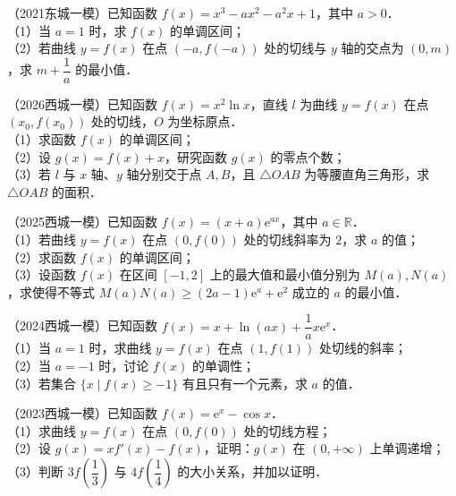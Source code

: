 \begin{example}
（2021东城一模）已知函数 $f(x)=x^3-ax^2-a^2x+1$，其中 $a>0$．\\
（1）当 $a=1$ 时，求 $f(x)$ 的单调区间；\\
（2）若曲线 $y=f(x)$ 在点 $(-a,f(-a))$ 处的切线与 $y$ 轴的交点为 $(0,m)$，求 $m+\dfrac1a$ 的最小值．
\end{example}

\begin{example}
（2026西城一模）已知函数 $f(x)=x^2\ln x$，直线 $l$ 为曲线 $y=f(x)$ 在点 $(x_0,f(x_0))$ 处的切线，$O$ 为坐标原点．\\
（1）求函数 $f(x)$ 的单调区间；\\
（2）设 $g(x)=f(x)+x$，研究函数 $g(x)$ 的零点个数；\\
（3）若 $l$ 与 $x$ 轴、$y$ 轴分别交于点 $A,B$，且 $\triangle OAB$ 为等腰直角三角形，求 $\triangle OAB$ 的面积．
\end{example}

\begin{example}
（2025西城一模）已知函数 $f(x)=(x+a)\mathrm{e}^{ax}$，其中 $a\in\mathbb{R}$．\\
（1）若曲线 $y=f(x)$ 在点 $(0,f(0))$ 处的切线斜率为 $2$，求 $a$ 的值；\\
（2）求函数 $f(x)$ 的单调区间；\\
（3）设函数 $f(x)$ 在区间 $[-1,2]$ 上的最大值和最小值分别为 $M(a),N(a)$，求使得不等式 $M(a)N(a)\geqslant(2a-1)\mathrm{e}^a+\mathrm{e}^2$ 成立的 $a$ 的最小值．
\end{example}

\begin{example}
（2024西城一模）已知函数 $f(x)=x+\ln(ax)+\dfrac1a x\mathrm{e}^x$．\\
（1）当 $a=1$ 时，求曲线 $y=f(x)$ 在点 $(1,f(1))$ 处切线的斜率；\\
（2）当 $a=-1$ 时，讨论 $f(x)$ 的单调性；\\
（3）若集合 $\{x\mid f(x)\geqslant-1\}$ 有且只有一个元素，求 $a$ 的值．
\end{example}

\begin{example}
（2023西城一模）已知函数 $f(x)=\mathrm{e}^x-\cos x$．\\
（1）求曲线 $y=f(x)$ 在点 $(0,f(0))$ 处的切线方程；\\
（2）设 $g(x)=xf'(x)-f(x)$，证明：$g(x)$ 在 $(0,+\infty)$ 上单调递增；\\
（3）判断 $3f\left(\dfrac13\right)$ 与 $4f\left(\dfrac14\right)$ 的大小关系，并加以证明．
\end{example}

